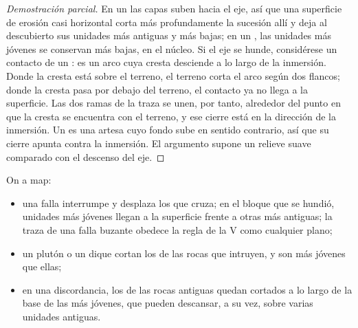 \begin{proof}[Demostración parcial]
En un  las capas suben hacia el eje, así que una superficie de erosión casi horizontal
corta más profundamente la sucesión allí y deja al descubierto sus unidades más antiguas y más
bajas; en un , las unidades más jóvenes se conservan más bajas, en el núcleo. Si el eje
se hunde, considérese un contacto de un : es un arco cuya cresta desciende a lo largo de
la inmersión. Donde la cresta está sobre el terreno, el terreno corta el arco según dos flancos;
donde la cresta pasa por debajo del terreno, el contacto ya no llega a la superficie. Las dos ramas
de la traza se unen, por tanto, alrededor del punto en que la cresta se encuentra con el terreno, y
ese cierre está en la dirección de la inmersión. Un  es una artesa cuyo fondo sube en
sentido contrario, así que su cierre apunta contra la inmersión. El argumento supone un relieve
suave comparado con el descenso del eje.
\end{proof}

\begin{proposition}\label{prop:b1:geological-maps:cuts}
On a map:
\begin{itemize}
  \item una falla interrumpe y desplaza los  que cruza; en el bloque que se hundió,
        unidades más jóvenes llegan a la superficie frente a otras más antiguas; la traza de una
        falla buzante obedece la regla de la V como cualquier plano;
  \item un plutón o un dique cortan los  de las rocas que intruyen, y son más jóvenes que
        ellas;
  \item en una discordancia, los  de las rocas antiguas quedan cortados a lo largo de la
        base de las más jóvenes, que pueden descansar, a su vez, sobre varias unidades antiguas.
\end{itemize}
\end{proposition}

